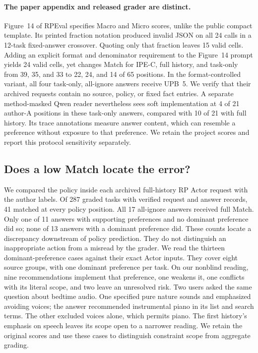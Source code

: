 \documentclass[11pt]{article}
\begin{document}
\paragraph{The paper appendix and released grader are distinct.}
Figure~14 of RPEval specifies Macro and Micro scores, unlike the public compact template. Its printed fraction notation produced invalid JSON on all 24 calls in a 12-task fixed-answer crossover. Quoting only that fraction leaves 15 valid cells. Adding an explicit format and denominator requirement to the Figure~14 prompt yields 24 valid cells, yet changes Match for IPE-C, full history, and task-only from 39, 35, and 33 to 22, 24, and 14 of 65 positions. In the format-controlled variant, all four task-only, all-ignore answers receive UPB~5. We verify that their archived requests contain no source, policy, or fixed fact entries. A separate method-masked Qwen reader nevertheless sees soft implementation at 4 of 21 author-A positions in these task-only answers, compared with 10 of 21 with full history. Its trace annotations measure answer content, which can resemble a preference without exposure to that preference. We retain the project scores and report this protocol sensitivity separately.

\subsection{Does a low Match locate the error?}

We compared the policy inside each archived full-history RP Actor request with the author labels. Of 287 graded tasks with verified request and answer records, 41 matched at every policy position. All 17 all-ignore answers received full Match. Only one of 11 answers with supporting preferences and no dominant preference did so; none of 13 answers with a dominant preference did. These counts locate a discrepancy downstream of policy prediction. They do not distinguish an inappropriate action from a misread by the grader. We read the thirteen dominant-preference cases against their exact Actor inputs. They cover eight source groups, with one dominant preference per task. On our nonblind reading, nine recommendations implement that preference, one weakens it, one conflicts with its literal scope, and two leave an unresolved risk. Two users asked the same question about bedtime audio. One specified pure nature sounds and emphasized avoiding voices; the answer recommended instrumental piano in its list and search terms. The other excluded voices alone, which permits piano. The first history's emphasis on speech leaves its scope open to a narrower reading. We retain the original scores and use these cases to distinguish constraint scope from aggregate grading.
\end{document}
